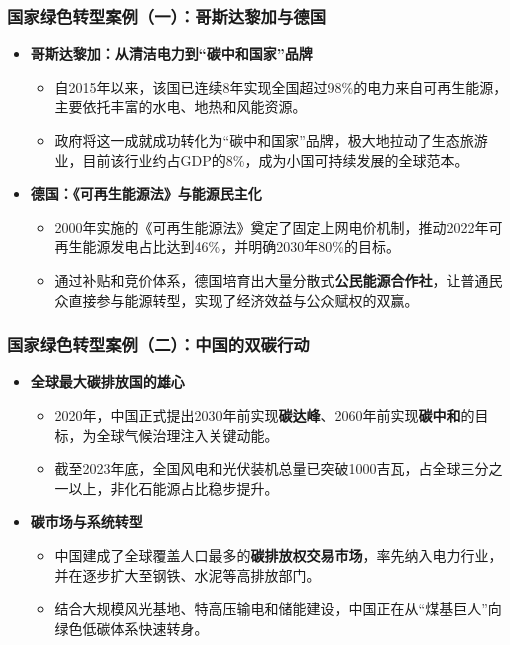 \documentclass[11pt]{beamer}
\begin{document}
\begin{frame}\frametitle{国家绿色转型案例（一）：哥斯达黎加与德国}
\begin{itemize}
    \item \textbf{哥斯达黎加：从清洁电力到“碳中和国家”品牌}
    \begin{itemize}
        \item 自2015年以来，该国已连续8年实现全国超过98\%的电力来自可再生能源，主要依托丰富的水电、地热和风能资源。
        \item 政府将这一成就成功转化为“碳中和国家”品牌，极大地拉动了生态旅游业，目前该行业约占GDP的8\%，成为小国可持续发展的全球范本。
    \end{itemize}
    \vspace{0.3cm}
    \item \textbf{德国：\alert{《可再生能源法》}与能源民主化}
    \begin{itemize}
        \item 2000年实施的《可再生能源法》奠定了固定上网电价机制，推动2022年可再生能源发电占比达到46\%，并明确2030年80\%的目标。
        \item 通过补贴和竞价体系，德国培育出大量分散式\textbf{公民能源合作社}，让普通民众直接参与能源转型，实现了经济效益与公众赋权的双赢。
    \end{itemize}
\end{itemize}
\end{frame}

\begin{frame}\frametitle{国家绿色转型案例（二）：中国的双碳行动}
\begin{itemize}
    \item \textbf{全球最大碳排放国的雄心}
    \begin{itemize}
        \item 2020年，中国正式提出2030年前实现\textbf{碳达峰}、2060年前实现\textbf{碳中和}的目标，为全球气候治理注入关键动能。
        \item 截至2023年底，全国风电和光伏装机总量已突破1000吉瓦，占全球三分之一以上，非化石能源占比稳步提升。
    \end{itemize}
    \vspace{0.2cm}
    \item \textbf{碳市场与系统转型}
    \begin{itemize}
        \item 中国建成了全球覆盖人口最多的\textbf{碳排放权交易市场}，率先纳入电力行业，并在逐步扩大至钢铁、水泥等高排放部门。
        \item 结合大规模风光基地、特高压输电和储能建设，中国正在从“煤基巨人”向绿色低碳体系快速转身。
    \end{itemize}
\end{itemize}
\end{frame}
\end{document}
